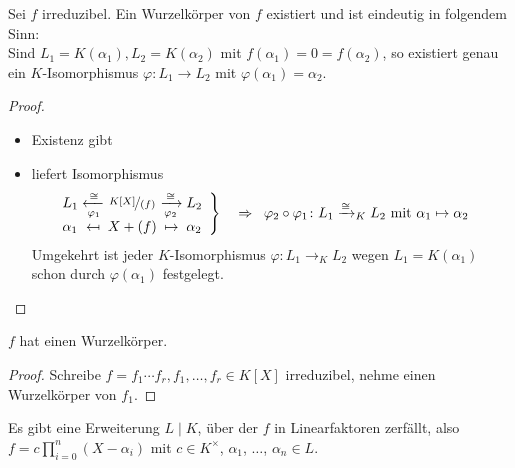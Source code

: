 \begin{proposition}
	Sei $f$ irreduzibel. Ein Wurzelkörper von $f$ existiert und ist eindeutig in folgendem Sinn:\\
	Sind $L_1 = K(\alpha_1), L_2 = K(\alpha_2)$ mit $f(\alpha_1) = 0 = f(\alpha_2)$, so existiert genau ein $K$-Isomorphismus $\varphi\colon L_1 \to L_2$ mit $\varphi(\alpha_1) = \alpha_2$.
\end{proposition}
\begin{proof}\leavevmode\vspace*{\dimexpr-\baselineskip+2\lineskip}
	\begin{itemize}
		\item Existenz gibt 
		\item {} liefert Isomorphismus
		\begin{align*}
			\left.\begin{array}{@{}l@{\;}c@{\;}c@{\;}c@{\;}l}
				L_1 & \xleftarrow[\varphi_1]{\cong} & \lnkset{K[X]}{(f)} & \xrightarrow[\varphi_2]{\cong} & L_2\\
				\alpha_1 & \mapsfrom & X + (f) & \mapsto & \alpha_2
			\end{array}\right\rbrace
			\quad\Rightarrow \;\;\varphi_2 \circ \varphi_1\colon L_1 \xrightarrow{\cong}_K L_2 \mit \alpha_1 \mapsto \alpha_2 &
		\end{align*}
		Umgekehrt ist jeder $K$-Isomorphismus $\varphi\colon L_1 \to_K L_2$ wegen $L_1 = K(\alpha_1)$ schon durch $\varphi(\alpha_1)$ festgelegt.
	\end{itemize}
\end{proof}
\begin{conclusion}
	$f$ hat einen Wurzelkörper.
\end{conclusion}
\begin{proof}
	Schreibe $f=f_1\cdots f_r, f_1,\dots,f_r \in K[X]$ irreduzibel, nehme einen Wurzelkörper von $f_1$.
\end{proof}
\begin{conclusion}
	Es gibt eine Erweiterung $L\mid K$, über der $f$ in Linearfaktoren zerfällt, also $f=c\prod_{i=0}^{n}(X-\alpha_i)$ mit $c \in K^{\times}$, $\alpha_1$, $\dots$, $\alpha_n \in L$. 
\end{conclusion}
